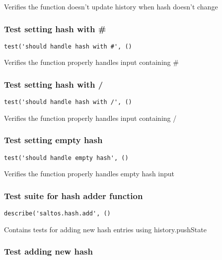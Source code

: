 \documentclass[a4paper]{article}
\begin{document}
Verifies the function doesn't update history when hash doesn't change

\hypertarget{toc205}{}
\subsubsection{Test setting hash with \#}

\begin{lstlisting}
test('should handle hash with #', ()
\end{lstlisting}

Verifies the function properly handles input containing \#

\hypertarget{toc206}{}
\subsubsection{Test setting hash with /}

\begin{lstlisting}
test('should handle hash with /', ()
\end{lstlisting}

Verifies the function properly handles input containing /

\hypertarget{toc207}{}
\subsubsection{Test setting empty hash}

\begin{lstlisting}
test('should handle empty hash', ()
\end{lstlisting}

Verifies the function properly handles empty hash input

\hypertarget{toc208}{}
\subsubsection{Test suite for hash adder function}

\begin{lstlisting}
describe('saltos.hash.add', ()
\end{lstlisting}

Contains tests for adding new hash entries
using history.pushState

\hypertarget{toc209}{}
\subsubsection{Test adding new hash}
\end{document}
